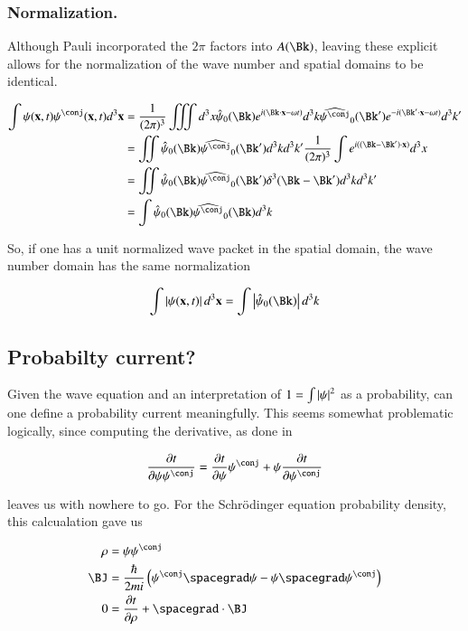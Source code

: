 \documentclass{article}
\begin{document}
\subsubsection{ Normalization. }

Although Pauli incorporated the $2\pi$ factors into $A(\Bk)$, leaving these explicit allows for the normalization of the wave number and spatial domains
to be identical.

\begin{align*}
\int 
\psi(\Bx,t) \psi^\conj(\Bx,t) d^3 \Bx
&= 
\inv{({2\pi})^3}
\iiint d^3 x
\hat{\psi}_0(\Bk) e^{ i (\Bk \cdot \Bx - \omega t)} d^3 k
\widehat{\psi^\conj}_0(\Bk') e^{ -i (\Bk' \cdot \Bx - \omega t)} d^3 k' 
\\
&= 
\iint \hat{\psi}_0(\Bk) \widehat{\psi^\conj}_0(\Bk') 
d^3 k d^3 k'
\inv{({2\pi})^3} \int e^{ i ((\Bk- \Bk') \cdot \Bx)} d^3 x
\\
&= 
\iint \hat{\psi}_0(\Bk) \widehat{\psi^\conj}_0(\Bk') \delta^3(\Bk-\Bk') d^3 k d^3 k'
\\
&= 
\int \hat{\psi}_0(\Bk) \widehat{\psi^\conj}_0(\Bk) d^3 k 
\\
\end{align*}

So, if one has a unit normalized wave packet in the spatial domain, the wave number domain has the same normalization

\begin{align}
\int \Abs{\psi(\Bx,t)} d^3 \Bx = \int \Abs{\hat{\psi}_0(\Bk)} d^3 k 
\end{align}

\subsection{ Probabilty current? }

Given the wave equation and an interpretation of $1 = \int \left\lvert{\psi}\right\rvert^2$ as a probability, can one define a probability current meaningfully.  This
seems somewhat problematic logically, since computing the derivative, as done in \cite{PJprobCurrent}

\begin{align*}
\PD{t}{\psi\psi^\conj} = \PD{t}{\psi}\psi^\conj + \psi \PD{t}{\psi^\conj}
\end{align*}

leaves us with nowhere to go.  For the 
Schr\"{o}dinger equation probability density, this calcualation gave us

\begin{align}\label{eqn:pcons}
\rho &= \psi\psi^\conj \\
\BJ &= \frac{\hbar}{2mi} \left( \psi^\conj \spacegrad \psi - \psi \spacegrad \psi^\conj \right) \\
0 &= \PD{t}{\rho} + \spacegrad \cdot \BJ 
\end{align}
\end{document}
